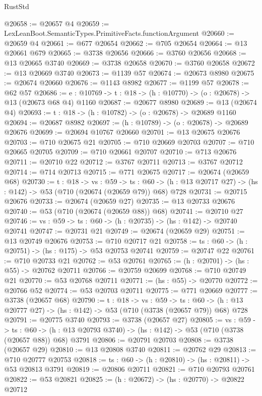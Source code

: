 \begin{lexlean}{RustStd}
\begin{coremodule}
@20658 := @20657 @4
@20659 := LexLeanBoot.SemanticTypes.PrimitiveFacts.functionArgument
@20660 := @20659 @4
@20661 := @677 @20654
@20662 := @705 @20654
@20664 := @13 @20661 @679
@20665 := @3738 @20656
@20666 := @3760 @20656
@20668 := @13 @20665 @3740
@20669 := @3738 @20658
@20670 := @3760 @20658
@20672 := @13 @20669 @3740
@20673 := @1139 @57
@20674 := @20673 @8980
@20675 := @20674 @20660
@20676 := @1143 @8982
@20677 := @1199 @57
@20678 := @62 @57
@20686 := {e : @10769} -> {t : @18} -> (h : @10770) -> (o : @20678) -> @13 (@20673 @68 @4) @1160
@20687 := @20677 @8980
@20689 := @13 (@20674 @4)
@20693 := {t : @18} -> (h : @10782) -> (o : @20678) -> @20689 @1160
@20694 := @20687 @8982
@20697 := (h : @10789) -> (o : @20678) -> @20689 @20676
@20699 := @20694 @10767 @20660
@20701 := @13 @20675 @20676
@20703 := @710 @20675 @21
@20705 := @710 @20669 @20703
@20707 := @710 @20665 @20705
@20709 := @710 @20661 @20707
@20710 := @713 @20676
@20711 := @20710 @22
@20712 := @3767 @20711
@20713 := @3767 @20712
@20714 := @714 @20713
@20715 := @771 @20675
@20717 := @20674 (@20659 @68)
@20730 := {t : @18} ->
  {vs : @59} ->
  {ts : @60} -> (h : @13 @20717 @27) -> (hs : @142) -> @53 (@710 (@20674 (@20659 @79)) @68) @728
@20731 := @20715 @20676
@20733 := @20674 (@20659 @27)
@20735 := @13 @20733 @20676
@20740 := @53 (@710 (@20674 (@20659 @88)) @68)
@20741 := @20710 @27
@20746 := {vs : @59} -> {ts : @60} -> (h : @20735) -> (hs : @142) -> @20740 @20741
@20747 := @20731 @21
@20749 := @20674 (@20659 @29)
@20751 := @13 @20749 @20676
@20753 := @710 @20717 @21
@20758 := {ts : @60} -> (h : @20751) -> (hs : @175) -> @53 @20753 @20741
@20759 := @20747 @22
@20761 := @710 @20733 @21
@20762 := @53 @20761
@20765 := (h : @20701) -> (hs : @55) -> @20762 @20711
@20766 := @20759 @20699
@20768 := @710 @20749 @21
@20770 := @53 @20768 @20711
@20771 := (hs : @55) -> @20770
@20772 := @20766 @52
@20774 := @53 @20703 @20711
@20775 := @771 @20669
@20777 := @3738 (@20657 @68)
@20790 := {t : @18} ->
  {vs : @59} ->
  {ts : @60} -> (h : @13 @20777 @27) -> (hs : @142) -> @53 (@710 (@3738 (@20657 @79)) @68) @728
@20791 := @20775 @3740
@20793 := @3738 (@20657 @27)
@20805 := {vs : @59} ->
  {ts : @60} -> (h : @13 @20793 @3740) -> (hs : @142) -> @53 (@710 (@3738 (@20657 @88)) @68) @3791
@20806 := @20791 @20703
@20808 := @3738 (@20657 @29)
@20810 := @13 @20808 @3740
@20811 := @20762 @29
@20813 := @710 @20777 @20753
@20818 := {ts : @60} -> (h : @20810) -> (hs : @20811) -> @53 @20813 @3791
@20819 := @20806 @20711
@20821 := @710 @20793 @20761
@20822 := @53 @20821
@20825 := (h : @20672) -> (hs : @20770) -> @20822 @20712

\end{coremodule}
\end{lexlean}
